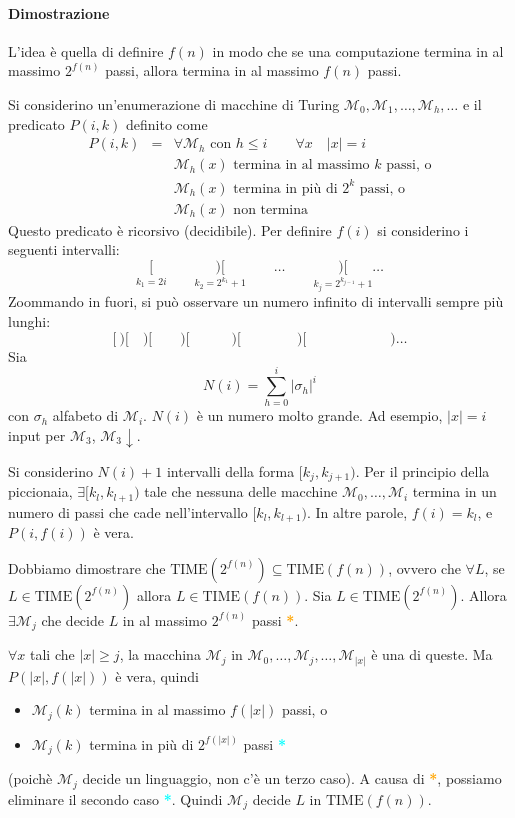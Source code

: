 \paragraph{Dimostrazione} L'idea è quella di definire $f(n)$ in modo che se una computazione termina in al massimo $2^{f(n)}$ passi, allora termina in al massimo $f(n)$ passi.

Si considerino un'enumerazione di macchine di Turing $\mathcal{M}_0,\mathcal{M}_1,\dots,\mathcal{M}_h,\dots$ e il predicato $P(i,k)$ definito come 
\begin{eqnarray*}
    P(i,k) &=& \forall\mathcal{M}_h \text{ con } h\leq i \qquad \forall x \quad |x|=i\\
    & & \mathcal{M}_h(x) \text{ termina in al massimo } k \text{ passi, o}\\
    & & \mathcal{M}_h(x) \text{ termina in più di } 2^k \text{ passi, o}\\
    & & \mathcal{M}_h(x) \text{ non termina}
\end{eqnarray*}
Questo predicato è ricorsivo (decidibile). Per definire $f(i)$ si considerino i seguenti intervalli:
$$
    \underset{k_1=2i}{[} \qquad \underset{k_2=2^{k_1}+1}{)[} \qquad\dots\qquad \underset{k_j=2^{k_{j-1}}+1}{)[} \dots
$$
Zoommando in fuori, si può osservare un numero infinito di intervalli sempre più lunghi:
$$
    [~)[\quad)[\qquad)[\quad\qquad)[\qquad\qquad)[\qquad\qquad\qquad)\dots
$$
Sia
$$
    N(i) = \sum_{h=0}^i |\sigma_h|^i
$$
con $\sigma_h$ alfabeto di $\mathcal{M}_i$. $N(i)$ è un numero molto grande. Ad esempio, $|x|=i$ input per $\mathcal{M}_3$, $\mathcal{M}_3\downarrow$.

Si considerino $N(i)+1$ intervalli della forma $[k_j,k_{j+1})$. Per il principio della piccionaia, $\exists [k_l,k_{l+1})$ tale che nessuna delle macchine $\mathcal{M}_0,\dots,\mathcal{M}_i$ termina in un numero di passi che cade nell'intervallo $[k_l,k_{l+1})$. In altre parole, $f(i)=k_l$, e $P(i,f(i))$ è vera.

Dobbiamo dimostrare che $\text{TIME}(2^{f(n)})\subseteq\text{TIME}(f(n))$, ovvero che $\forall L$, se $L\in\text{TIME}(2^{f(n)})$ allora $L\in\text{TIME}(f(n))$. Sia $L\in\text{TIME}(2^{f(n)})$. Allora $\exists\mathcal{M}_j$ che decide $L$ in al massimo $2^{f(n)}$ passi \textcolor{Orange}{\textbf{*}}.

$\forall x$ tali che $|x|\geq j$, la macchina $\mathcal{M}_j$ in $\mathcal{M}_0,\dots,\mathcal{M}_j,\dots,\mathcal{M}_{|x|}$ è una di queste. Ma $P(|x|,f(|x|))$ è vera, quindi 
\begin{itemize}
    \item $\mathcal{M}_j(k)$ termina in al massimo $f(|x|)$ passi, o 
    \item $\mathcal{M}_j(k)$ termina in più di $2^{f(|x|)}$ passi \textcolor{Cyan}{\textbf{*}}
\end{itemize}
(poichè $\mathcal{M}_j$ decide un linguaggio, non c'è un terzo caso). A causa di \textcolor{Orange}{\textbf{*}}, possiamo eliminare il secondo caso \textcolor{Cyan}{\textbf{*}}. Quindi $\mathcal{M}_j$ decide $L$ in $\text{TIME}(f(n))$.

